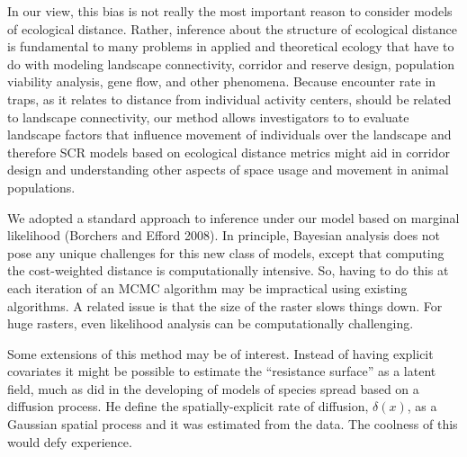 In our view, this bias is not really the most important reason to consider models of
ecological distance. Rather, inference about the structure of
ecological distance is fundamental to many problems in applied and
theoretical ecology that have to do with modeling landscape
connectivity, corridor and reserve design, population viability
analysis, gene flow, and other phenomena. 
Because encounter rate in traps, as it relates to distance from
individual activity centers, should be related to landscape
connectivity, our method allows investigators to to evaluate landscape
factors that influence movement of individuals over the landscape and
therefore SCR models based on ecological distance metrics might aid in
corridor design and understanding other aspects of space usage and
movement in animal populations. 

We adopted a standard approach to inference under our model based on
marginal likelihood (Borchers and Efford 2008). In principle, 
Bayesian analysis does not pose any unique challenges for this new
class of models, except that computing the cost-weighted distance is
computationally intensive. 
 So, having to do this at each iteration of an
MCMC algorithm may be impractical using existing algorithms.
A related issue is that the size of the raster slows things down. For
huge rasters, even likelihood analysis can be computationally challenging.

Some extensions of this method may be of interest. Instead of 
having explicit covariates it might be possible to estimate the 
``resistance surface'' as a latent field, much as \citep{wikle:2003}
 did in the developing of models of species spread based on a
 diffusion process. He define the spatially-explicit rate of 
diffusion, $\delta(x)$, as a Gaussian spatial process and it was
estimated from the data.  The coolness of this would defy experience. 




















